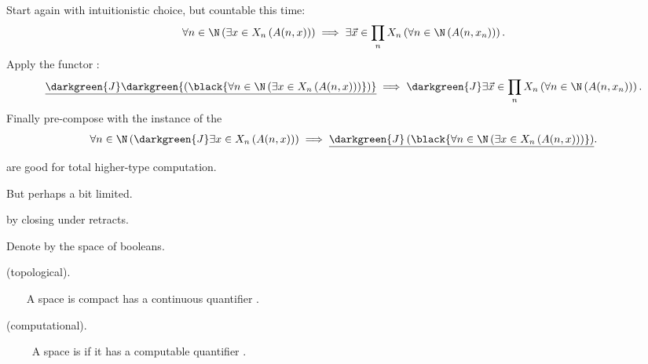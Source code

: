\documentclass%
[%
Screen4to3,
]{foils}
\begin{document}
 Start again with intuitionistic choice, but countable this time:
\[
\forall n \in \N \left(\exists x \in X_n \left(A(n,x)\right)\right)
\implies 
\exists \vec{x} \in \prod_n X_n\left(\forall n \in \N\left(A(n,x_n)\right) \right).
\]
 Apply the functor :
\[
\underline{\darkgreen{J} \darkgreen{\left(\black{\forall n \in \N \left(\exists x \in X_n \left(A(n,x)\right)\right)}\right)}}
\implies 
\darkgreen{J}
\exists \vec{x} \in \prod_n X_n\left(\forall n \in \N\left(A(n,x_n)\right) \right).
\]
 Finally pre-compose with the instance of the  
\[
\forall n \in \N \left(\darkgreen{J} \exists x \in X_n \left(A(n,x)\right)\right)
\implies
\underline{\darkgreen{J} \left(\black{\forall n \in \N \left(\exists x \in X_n \left(A(n,x)\right)\right)}\right)}.
\]




\vfill


\vfill

 are good for total higher-type
computation.

\vfill

But perhaps a bit limited.

\vfill

 by closing under retracts. 

\vfill

Denote by  the space of booleans.




\vfill

  (topological).

~~~ A space  is compact \darkgreen{$\iff$}
has a continuous quantifier .

\vfill

  (computational).

~~~~ A space  is  if it has a computable
quantifier .

\vfill
\end{document}
